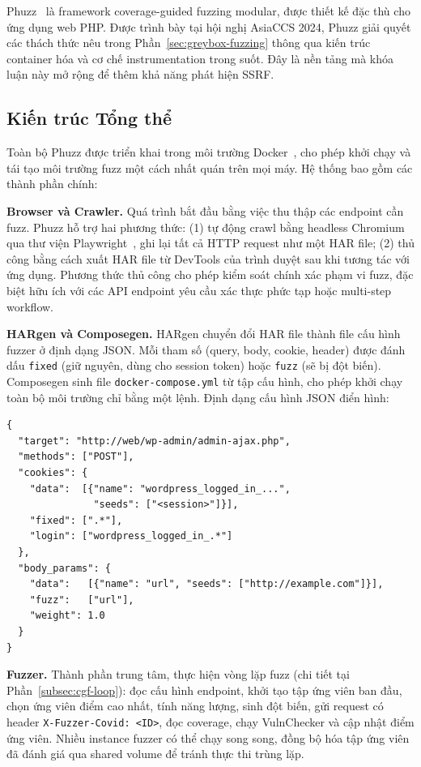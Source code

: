 Phuzz~\cite{neef2024phuzz} là framework coverage-guided fuzzing modular,
được thiết kế đặc thù cho ứng dụng web PHP. Được trình bày tại hội nghị
AsiaCCS 2024, Phuzz giải quyết các thách thức nêu trong
Phần~\ref{sec:greybox-fuzzing} thông qua kiến trúc container hóa và cơ chế
instrumentation trong suốt. Đây là nền tảng mà khóa luận này mở rộng để
thêm khả năng phát hiện SSRF.

\subsection{Kiến trúc Tổng thể}

Toàn bộ Phuzz được triển khai trong môi trường Docker~\cite{docker2023}, cho
phép khởi chạy và tái tạo môi trường fuzz một cách nhất quán trên mọi máy.
Hệ thống bao gồm các thành phần chính:

\textbf{Browser và Crawler.} Quá trình bắt đầu bằng việc thu thập các
endpoint cần fuzz. Phuzz hỗ trợ hai phương thức: (1) tự động crawl bằng
headless Chromium qua thư viện Playwright~\cite{microsoft2024playwright},
ghi lại tất cả HTTP request như một HAR file; (2) thủ công bằng cách xuất
HAR file từ DevTools của trình duyệt sau khi tương tác với ứng dụng. Phương
thức thủ công cho phép kiểm soát chính xác phạm vi fuzz, đặc biệt hữu ích
với các API endpoint yêu cầu xác thực phức tạp hoặc multi-step workflow.

\textbf{HARgen và Composegen.} HARgen chuyển đổi HAR file thành file cấu
hình fuzzer ở định dạng JSON. Mỗi tham số (query, body, cookie, header) được
đánh dấu \texttt{fixed} (giữ nguyên, dùng cho session token) hoặc
\texttt{fuzz} (sẽ bị đột biến). Composegen sinh file
\texttt{docker-compose.yml} từ tập cấu hình, cho phép khởi chạy toàn bộ
môi trường chỉ bằng một lệnh. Định dạng cấu hình JSON điển hình:

\begin{verbatim}
{
  "target": "http://web/wp-admin/admin-ajax.php",
  "methods": ["POST"],
  "cookies": {
    "data":  [{"name": "wordpress_logged_in_...",
               "seeds": ["<session>"]}],
    "fixed": [".*"],
    "login": ["wordpress_logged_in_.*"]
  },
  "body_params": {
    "data":   [{"name": "url", "seeds": ["http://example.com"]}],
    "fuzz":   ["url"],
    "weight": 1.0
  }
}
\end{verbatim}

\textbf{Fuzzer.} Thành phần trung tâm, thực hiện vòng lặp fuzz (chi tiết tại
Phần~\ref{subsec:cgf-loop}): đọc cấu hình endpoint, khởi tạo tập ứng viên
ban đầu, chọn ứng viên điểm cao nhất, tính năng lượng, sinh đột biến, gửi
request có header \texttt{X-Fuzzer-Covid: <ID>}, đọc coverage, chạy
VulnChecker và cập nhật điểm ứng viên. Nhiều instance fuzzer có thể chạy
song song, đồng bộ hóa tập ứng viên đã đánh giá qua shared volume để tránh
thực thi trùng lặp.

